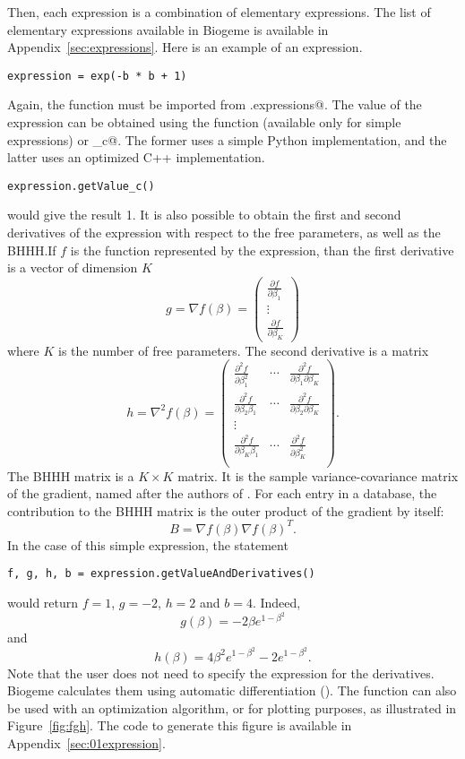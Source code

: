 \documentclass[12pt,a4paper]{article}
\newcommand{\cvect}[1]{\left(\begin{array}{c} #1 \end{array} \right) }
\begin{document}
Then, each expression is a combination of elementary
expressions. The list of elementary expressions available in Biogeme
is available in Appendix~\ref{sec:expressions}. Here is an example of
an expression.
\begin{lstlisting}[style=nonumbers]
expression = exp(-b * b + 1)
\end{lstlisting}
Again, the function \lstinline@exp@ must be imported from \lstinline@biogeme.expressions@.
The value of the expression can be obtained using the function
\lstinline@getValue@ (available only for simple expressions) or
\lstinline@getValue_c@. The former uses a simple Python
implementation, and the latter uses an optimized C++ implementation.
\begin{lstlisting}[style=nonumbers]
expression.getValue_c()
\end{lstlisting}
would give the result 1.
It is also possible to obtain the first and second derivatives of the
expression with respect to the free parameters, as well as the
BHHH.\@ If $f$ is the function represented by the expression, than the
first derivative is a vector of dimension $K$
\[
g = \nabla f(\beta) = \cvect{\frac{\partial f}{\partial \beta_1}
  \\ \vdots \\ \frac{\partial f}{\partial \beta_K}}
\]
where $K$ is the number of free parameters. The second derivative is a
matrix
\[
h = \nabla^2 f(\beta) = \left(
\begin{array}{ccc}
\frac{\partial^2 f}{\partial \beta_1^2} & \cdots & \frac{\partial^2
  f}{\partial \beta_1 \partial \beta_K} \\
\frac{\partial^2 f}{\partial \beta_2 \beta_1 } & \cdots & \frac{\partial^2
  f}{\partial \beta_2 \partial \beta_K} \\
\vdots \\
\frac{\partial^2 f}{\partial \beta_K \beta_1 } & \cdots & \frac{\partial^2
  f}{\partial \beta^2_K} \\
\end{array}
\right).
\]
The BHHH matrix is a $K \times K$ matrix. It is the sample variance-covariance matrix of the
gradient, named after the authors of
. For each entry in a database, the
contribution to the BHHH matrix is the outer product of the gradient
by itself:
\[
B = \nabla f(\beta) \nabla f(\beta)^T.
\]
In the case of this simple expression, the statement
\begin{lstlisting}[style=nonumbers]
f, g, h, b = expression.getValueAndDerivatives()
\end{lstlisting}
would return $f=1$, $g=-2$, $h=2$ and $b=4$. Indeed,
\[
g(\beta) = -2 \beta e^{1-\beta^2}
\]
and
\[
h(\beta) = 4 \beta^2 e^{1-\beta^2} - 2 e^{1-\beta^2}.
\]
Note that the user does not need to specify the expression for the
derivatives. Biogeme calculates them using automatic differentiation (\cite{Grie89}).
The function can also be used with an optimization algorithm, or for
plotting purposes, as illustrated in Figure~\ref{fig:fgh}. The code to
generate this figure is available in Appendix~\ref{sec:01expression}.
\end{document}
